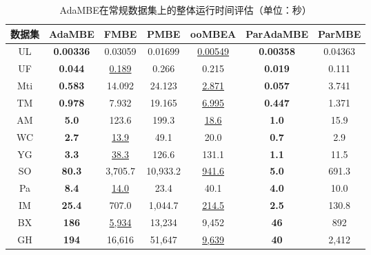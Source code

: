 \begin{table} [H]
	\centering    
	\setlength{\abovecaptionskip}{0cm}  
  \setlength{\belowcaptionskip}{-0.1cm}
	\caption{AdaMBE在常规数据集上的整体运行时间评估（单位：秒）}      
	\label{tbl:ada_time}
	\setlength{\tabcolsep}{5pt}
	\begin{center}
				\normalsize{
		\begin{tabular}{|c|c|c|c|c||c|c|}
			\hline 

      \textbf{数据集} & \textbf{AdaMBE} & \textbf{FMBE} & \textbf{PMBE} & \textbf{ooMBEA} & \textbf{ParAdaMBE} & \textbf{ParMBE} \\ \hline

      UL	&\textbf{0.00336}	&0.03059	&0.01699	&\uline{0.00549}	&\textbf{0.00358}	&0.04363 \\
      UF &	\textbf{0.044}	&\uline{0.189}	&0.266	&0.215	&\textbf{0.019}	&0.111 \\
      Mti	&\textbf{0.583}	&14.092	&24.123	&\uline{2.871}	&\textbf{0.057}	&3.741 \\
      TM	&\textbf{0.978}	&7.932	&19.165	&\uline{6.995}	&\textbf{0.447}	&1.371 \\      
      AM & \textbf{5.0} & 123.6 & 199.3 & \uline{18.6} & \textbf{1.0} & 15.9 \\
      WC & \textbf{2.7} & \uline{13.9} & 49.1 & 20.0 & \textbf{0.7} & 2.9 \\
      YG & \textbf{3.3} & \uline{38.3} & 126.6 & 131.1 & \textbf{1.1} & 11.5 \\
      SO & \textbf{80.3} & 3,705.7 & 10,933.2 & \uline{941.6} & \textbf{5.0} & 691.3 \\
      Pa & \textbf{8.4} & \uline{14.0} & 23.4 & 40.1 & \textbf{4.0} & 10.0 \\
      IM & \textbf{25.4} & 707.0 & 1,044.7 & \uline{214.5} & \textbf{2.5} & 130.8 \\
      BX & \textbf{186} & \uline{5,934} & 13,234 & 9,452 & \textbf{46} & 892 \\
      GH & \textbf{194} & 16,616 & 51,647 & \uline{9,639} & \textbf{40} & 2,412 \\
      
      \hline
      
		\end{tabular}
				}
	\end{center}
  \vspace{-8pt}
\end{table}
